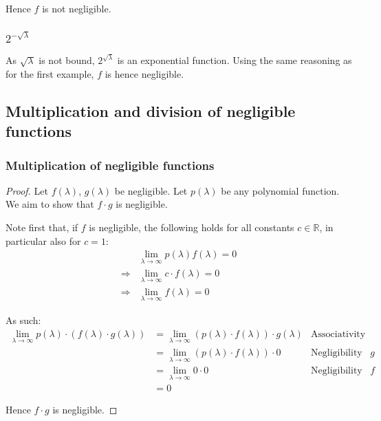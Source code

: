 \documentclass[a4paper]{scrreprt}
\begin{document}
Hence $f$ is not negligible.

\subsubsection{$2^{-\sqrt{\lambda}}$}

As $\sqrt{\lambda}$ is not bound, $2^{\sqrt{\lambda}}$ is an exponential
function. Using the same reasoning as for the first example, $f$ is hence
negligible.

\subsection{Multiplication and division of negligible functions}

\subsubsection{Multiplication of negligible functions}

\begin{proof}
	Let $f(\lambda)$, $g(\lambda)$ be negligible. Let $p(\lambda)$ be any
	polynomial function. We aim to show that $f \cdot g$ is negligible.

	Note first that, if $f$ is negligible, the following holds for all
	constants $c \in \mathbb{R}$, in particular also for $c = 1$:
	\begin{align*}
		& \lim_{\lambda \rightarrow \infty} p(\lambda) f(\lambda) = 0 \\
		\Rightarrow & \lim_{\lambda \rightarrow \infty} c \cdot f(\lambda) = 0 \\
		\Rightarrow & \lim_{\lambda \rightarrow \infty} f(\lambda) = 0
	\end{align*}

	As such:
	\begin{align*}
		\lim_{\lambda \rightarrow \infty} p(\lambda) \cdot (f(\lambda) \cdot g(\lambda)) 
		  & = \lim_{\lambda \rightarrow \infty} (p(\lambda) \cdot f(\lambda)) \cdot g(\lambda) & \text{Associativity of multiplication} \\
		  & = \lim_{\lambda \rightarrow \infty} (p(\lambda) \cdot f(\lambda)) \cdot 0 & \text{Negligibility of $g$} \\
		  & = \lim_{\lambda \rightarrow \infty} 0 \cdot 0 & \text{Negligibility of $f$} \\
		  & = 0
	\end{align*}

	Hence $f \cdot g$ is negligible.
\end{proof}
\end{document}
